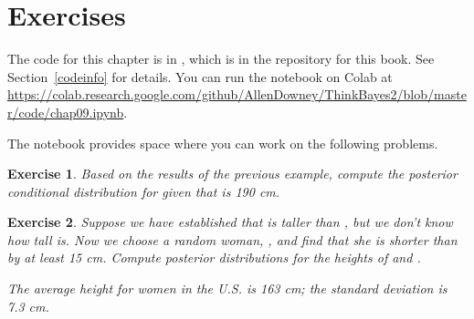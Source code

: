 \documentclass[12pt]{book}
\theoremstyle{exercise}
\newtheorem{exercise}{Exercise}[chapter]
\begin{document}
\section{Exercises}

The code for this chapter is in , which is in the repository for this book.  See Section~\ref{codeinfo} for details.
You can run the notebook on Colab at \url{https://colab.research.google.com/github/AllenDowney/ThinkBayes2/blob/master/code/chap09.ipynb}.

The notebook provides space where you can work on the following problems.

\begin{exercise}
Based on the results of the previous example, compute the posterior conditional distribution for  given that  is 190 cm.
\end{exercise}


\begin{exercise}
Suppose we have established that  is taller than , but we don't know how tall  is.
Now we choose a random woman, , and find that she is shorter than  by at least 15 cm.  Compute posterior distributions for the heights of  and .

The average height for women in the U.S. is 163 cm; the standard deviation is 7.3 cm. 
\end{exercise}
\end{document}
